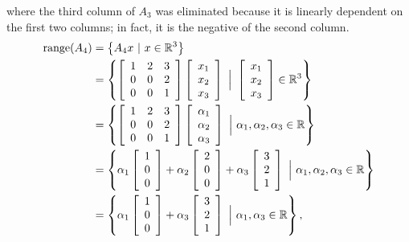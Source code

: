 where the third column of $A_3$ was eliminated because it is linearly dependent on the first two columns; in fact, it is the negative of the second column.
\begin{align*}
    \range(A_4)&= \left\{ A_4 x~|~ x \in \real^3  \right\} \bigskip \\
    &=  \left\{ \left[\begin{array}{ccc}  1 & 2 & 3 \\  0 & 0 & 2 \\ 0 & 0 & 1\end{array} \right] \left[\begin{array}{c}  x_1 \\ x_2 \\ x_3\\ \end{array} \right]~\Big|~ \left[\begin{array}{c}  x_1 \\ x_2 \\ x_3\\ \end{array} \right] \in \real^3  \right\} \bigskip \\
    &=  \left\{\left[\begin{array}{ccc}  1 & 2 & 3 \\  0 & 0 & 2 \\ 0 & 0 & 1\end{array} \right] \left[\begin{array}{c}  \alpha_1 \\ \alpha_2 \\ \alpha_3\\ \end{array} \right]~\Big|~  \alpha_1, \alpha_2, \alpha_3 \in \real \right\} \medskip\\
    &=  \left\{ \alpha_1 \left[\begin{array}{r}  1 \\ 0 \\ 0\end{array} \right] + \alpha_2 \left[\begin{array}{r}  2 \\ 0 \\ 0 \end{array} \right] + \alpha_3 \left[\begin{array}{c}  3 \\ 2 \\ 1 \end{array} \right]~\Big|~  \alpha_1, \alpha_2, \alpha_3 \in \real \right\} \medskip \\
     &=   \left\{ \alpha_1 \left[\begin{array}{r}  1 \\ 0 \\ 0\end{array} \right]  + \alpha_3 \left[\begin{array}{c}  3 \\ 2 \\ 1 \end{array} \right]~\Big|~  \alpha_1, \alpha_3 \in \real \right\}, 
\end{align*}
